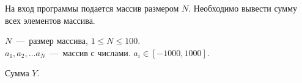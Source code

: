На вход программы подается массив размером $N$. Необходимо вывести сумму всех элементов массива.

\InputFile

\noindent
$N$~---~размер массива, $1 \leq N \leq 100$. \\
$a_1, a_2, \ldots a_N$~---~массив с числами. $ a_i \in [-1000, 1000]$. 

\OutputFile

Сумма $Y$.

\SAMPLES

